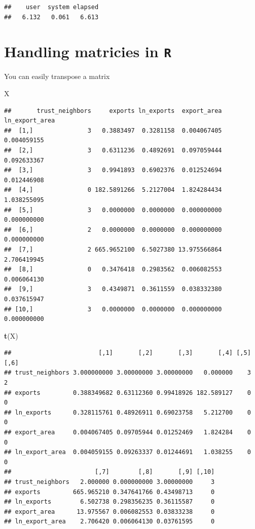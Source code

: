 \documentclass[]{book}
\newenvironment{Shaded}{\begin{snugshade}}{\end{snugshade}}
\newcommand{\KeywordTok}[1]{\textcolor[rgb]{0.13,0.29,0.53}{\textbf{#1}}}
\newcommand{\NormalTok}[1]{#1}
\theoremstyle{definition}
\theoremstyle{definition}
\theoremstyle{definition}
\theoremstyle{remark}
\begin{document}
\begin{verbatim}
##    user  system elapsed 
##   6.132   0.061   6.613
\end{verbatim}

\hypertarget{handling-matricies-in-r}{%
\section{\texorpdfstring{Handling matricies in \texttt{R}}{Handling matricies in R}}\label{handling-matricies-in-r}}

You can easily transpose a matrix

\begin{Shaded}
\begin{Highlighting}[]
\NormalTok{X}
\end{Highlighting}
\end{Shaded}

\begin{verbatim}
##       trust_neighbors     exports ln_exports  export_area ln_export_area
##  [1,]               3   0.3883497  0.3281158  0.004067405    0.004059155
##  [2,]               3   0.6311236  0.4892691  0.097059444    0.092633367
##  [3,]               3   0.9941893  0.6902376  0.012524694    0.012446908
##  [4,]               0 182.5891266  5.2127004  1.824284434    1.038255095
##  [5,]               3   0.0000000  0.0000000  0.000000000    0.000000000
##  [6,]               2   0.0000000  0.0000000  0.000000000    0.000000000
##  [7,]               2 665.9652100  6.5027380 13.975566864    2.706419945
##  [8,]               0   0.3476418  0.2983562  0.006082553    0.006064130
##  [9,]               3   0.4349871  0.3611559  0.038332380    0.037615947
## [10,]               3   0.0000000  0.0000000  0.000000000    0.000000000
\end{verbatim}

\begin{Shaded}
\begin{Highlighting}[]
\KeywordTok{t}\NormalTok{(X)}
\end{Highlighting}
\end{Shaded}

\begin{verbatim}
##                        [,1]       [,2]       [,3]       [,4] [,5] [,6]
## trust_neighbors 3.000000000 3.00000000 3.00000000   0.000000    3    2
## exports         0.388349682 0.63112360 0.99418926 182.589127    0    0
## ln_exports      0.328115761 0.48926911 0.69023758   5.212700    0    0
## export_area     0.004067405 0.09705944 0.01252469   1.824284    0    0
## ln_export_area  0.004059155 0.09263337 0.01244691   1.038255    0    0
##                       [,7]        [,8]       [,9] [,10]
## trust_neighbors   2.000000 0.000000000 3.00000000     3
## exports         665.965210 0.347641766 0.43498713     0
## ln_exports        6.502738 0.298356235 0.36115587     0
## export_area      13.975567 0.006082553 0.03833238     0
## ln_export_area    2.706420 0.006064130 0.03761595     0
\end{verbatim}
\end{document}
